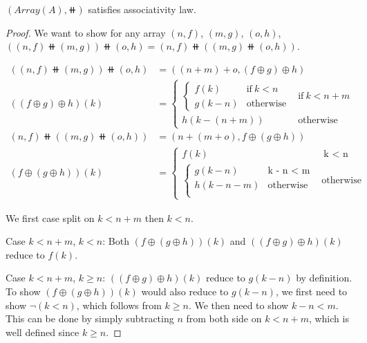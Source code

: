\begin{proposition}[Associativity]
$(Array(A), \doubleplus)$ satisfies associativity law.
\end{proposition}

\begin{proof}
We want to show for any array $(n, f)$, $(m, g)$, $(o, h)$,
$((n, f) \doubleplus (m, g)) \doubleplus (o, h) = (n, f) \doubleplus ((m, g) \doubleplus (o, h))$.

\begin{align*}
    ((n, f) \doubleplus (m, g)) \doubleplus (o, h) & = ((n + m) + o, (f \oplus g) \oplus h) \\
    ((f \oplus g) \oplus h)(k) & = \begin{cases}
        \begin{cases}
            f(k) & \text{if}\ k < n \\
            g(k - n) & \text{otherwise}
        \end{cases}
      & \text{if}\ k < n + m \\
      h(k - (n + m)) & \text{otherwise}
    \end{cases} \\
    (n, f) \doubleplus ((m, g) \doubleplus (o, h)) & = (n + (m + o), f \oplus (g \oplus h)) \\
    (f \oplus (g \oplus h))(k) & = \begin{cases}
        f(k) &\ \text{k < n} \\
        \begin{cases}
            g(k - n) & \text{k - n < m} \\
            h(k - n - m) & \text{otherwise} \\
        \end{cases} & \text{otherwise}
    \end{cases}
\end{align*} 

We first case split on $k < n + m$ then $k < n$.

Case $k < n + m$, $k < n$: Both $(f \oplus (g \oplus h))(k)$ and $((f \oplus g) \oplus h)(k)$ reduce to $f(k)$.

Case $k < n + m$, $k \geq n$: $((f \oplus g) \oplus h)(k)$ reduce to $g(k - n)$ by definition.
To show $(f \oplus (g \oplus h))(k)$ would also reduce to $g(k - n)$, we first need to show $\neg(k < n)$,
which follows from $k \geq n$. We then need to show $k - n < m$.
This can be done by simply subtracting $n$ from both side on $k < n + m$, which is well defined since $k \geq n$. 


\end{proof}
